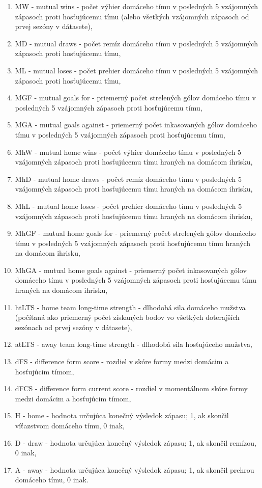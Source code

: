 \begin{enumerate}
 \item MW - mutual wins - počet výhier domáceho tímu v posledných 5 vzájomných zápasoch proti hosťujúcemu tímu (alebo všetkých vzájomných zápasoch od prvej sezóny v dátasete),
 \item MD - mutual draws - počet remíz domáceho tímu v posledných 5 vzájomných zápasoch proti hosťujúcemu tímu,
 \item ML - mutual loses - počet prehier domáceho tímu v posledných 5 vzájomných zápasoch proti hosťujúcemu tímu,
 \item MGF - mutual goals for - priemerný počet strelených gólov domáceho tímu v posledných 5 vzájomných zápasoch proti hosťujúcemu tímu,
 \item MGA - mutual goals against - priemerný počet inkasovaných gólov domáceho tímu v posledných 5 vzájomných zápasoch proti hosťujúcemu tímu,
 \item MhW - mutual home wins - počet výhier domáceho tímu v posledných 5 vzájomných zápasoch proti hosťujúcemu tímu hraných na domácom ihrisku,
 \item MhD - mutual home draws - počet remíz domáceho tímu v posledných 5 vzájomných zápasoch proti hosťujúcemu tímu hraných na domácom ihrisku,
 \item MhL - mutual home loses - počet prehier domáceho tímu v posledných 5 vzájomných zápasoch proti hosťujúcemu tímu hraných na domácom ihrisku,
 \item MhGF - mutual home goals for - priemerný počet strelených gólov domáceho tímu v posledných 5 vzájomných zápasoch proti hosťujúcemu tímu hraných na domácom ihrisku,
 \item MhGA - mutual home goals against - priemerný počet inkasovaných gólov domáceho tímu v posledných 5 vzájomných zápasoch proti hosťujúcemu tímu hraných na domácom ihrisku,
 \item htLTS - home team long-time strength - dlhodobá sila domáceho mužstva (počítaná ako priemerný počet získaných bodov vo všetkých doterajších sezónach od prvej sezóny v dátasete),
 \item atLTS - away team long-time strength - dlhodobá sila hosťujúceho mužstva,
 \label{dFS}
 \item dFS - difference form score - rozdiel v skóre formy medzi domácim a hosťujúcim tímom,
 \item dFCS - difference form current score - rozdiel v momentálnom skóre formy medzi domácim a hosťujúcim tímom,
 \item H - home - hodnota určujúca konečný výsledok zápasu; 1, ak skončil víťazstvom domáceho tímu, 0 inak,
 \item D - draw - hodnota určujúca konečný výsledok zápasu; 1, ak skončil remízou, 0 inak, 
 \item A - away - hodnota určujúca konečný výsledok zápasu; 1, ak skončil prehrou domáceho tímu, 0 inak.
\end{enumerate}

